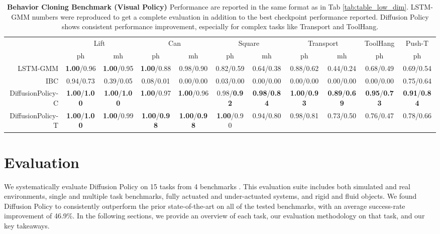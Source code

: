 \documentclass[Afour,sageh,times]{sagej}
\begin{document}
\begin{table}[h]
{\setlength\tabcolsep{ 3 pt}
\begin{tabular}{r|cc|cc|cc|cc|c|c}
\toprule
 & \multicolumn{2}{c|}{Lift} & \multicolumn{2}{c|}{Can} & \multicolumn{2}{c|}{Square} & \multicolumn{2}{c|}{Transport} & \multicolumn{1}{c|}{ToolHang} & \multicolumn{1}{c}{Push-T} \\
 & ph & mh & ph & mh & ph & mh & ph & mh & ph & ph \\
\midrule
LSTM-GMM & \small \textbf{1.00}/0.96 & \small \textbf{1.00}/0.95 & \small \textbf{1.00}/0.88 & \small 0.98/0.90 & \small 0.82/0.59 & \small 0.64/0.38 & \small 0.88/0.62 & \small 0.44/0.24 & \small 0.68/0.49 & \small 0.69/0.54 \\
IBC & \small 0.94/0.73 & \small 0.39/0.05 & \small 0.08/0.01 & \small 0.00/0.00 & \small 0.03/0.00 & \small 0.00/0.00 & \small 0.00/0.00 & \small 0.00/0.00 & \small 0.00/0.00 & \small 0.75/0.64 \\
DiffusionPolicy-C & \small \textbf{1.00}/\textbf{1.00} & \small \textbf{1.00}/\textbf{1.00} & \small \textbf{1.00}/0.97 & \small \textbf{1.00}/0.96 & \small 0.98/\textbf{0.92} & \small \textbf{0.98}/\textbf{0.84} & \small \textbf{1.00}/\textbf{0.93} & \small \textbf{0.89}/\textbf{0.69} & \small \textbf{0.95}/\textbf{0.73} & \small \textbf{0.91}/\textbf{0.84} \\
DiffusionPolicy-T & \small \textbf{1.00}/\textbf{1.00} & \small \textbf{1.00}/0.99 & \small \textbf{1.00}/\textbf{0.98} & \small \textbf{1.00}/\textbf{0.98} & \small \textbf{1.00}/0.90 & \small 0.94/0.80 & \small 0.98/0.81 & \small 0.73/0.50 & \small 0.76/0.47 & \small 0.78/0.66 \\
\bottomrule
\end{tabular}
\caption{\textbf{Behavior Cloning Benchmark (Visual Policy) \label{tab:table_image}} Performance are reported in the same format as in Tab \ref{tab:table_low_dim}. LSTM-GMM numbers were reproduced to get a complete evaluation in addition to the best checkpoint performance reported. Diffusion Policy shows consistent performance improvement, especially for complex tasks like Transport and ToolHang. }
}
\end{table}

\section{Evaluation}
We systematically evaluate Diffusion Policy on 15 tasks from 4 benchmarks \cite{ibc, gupta2019relay, robomimic, bet}. This evaluation suite includes both simulated and real environments, single and multiple task benchmarks, fully actuated and under-actuated systems, and rigid and fluid objects.  We found Diffusion Policy to consistently outperform the prior state-of-the-art on all of the tested benchmarks, with an average success-rate improvement of 46.9\%. In the following sections, we  provide an overview of each task, our evaluation methodology on that task, and our key takeaways.
\end{document}
